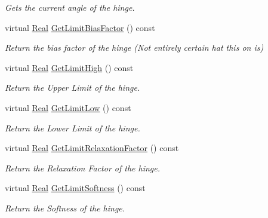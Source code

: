 \begin{DoxyCompactItemize}
\begin{DoxyCompactList}\small\item\em Gets the current angle of the hinge. \item\end{DoxyCompactList}\item 
virtual \hyperlink{namespaceMezzanine_a726731b1a7df72bf3583e4a97282c6f6}{Real} \hyperlink{classMezzanine_1_1HingeConstraint_aa614cc523ffa01d50e83ef2472126419}{GetLimitBiasFactor} () const 
\begin{DoxyCompactList}\small\item\em Return the bias factor of the hinge (Not entirely certain hat this on is) \item\end{DoxyCompactList}\item 
virtual \hyperlink{namespaceMezzanine_a726731b1a7df72bf3583e4a97282c6f6}{Real} \hyperlink{classMezzanine_1_1HingeConstraint_acb0a9676b91cf7c987569bed3510b5da}{GetLimitHigh} () const 
\begin{DoxyCompactList}\small\item\em Return the Upper Limit of the hinge. \item\end{DoxyCompactList}\item 
virtual \hyperlink{namespaceMezzanine_a726731b1a7df72bf3583e4a97282c6f6}{Real} \hyperlink{classMezzanine_1_1HingeConstraint_a7815264c012e03fdf09a72d1aa76e50f}{GetLimitLow} () const 
\begin{DoxyCompactList}\small\item\em Return the Lower Limit of the hinge. \item\end{DoxyCompactList}\item 
virtual \hyperlink{namespaceMezzanine_a726731b1a7df72bf3583e4a97282c6f6}{Real} \hyperlink{classMezzanine_1_1HingeConstraint_a547dfa04268f9fa0d938fb00a082fc03}{GetLimitRelaxationFactor} () const 
\begin{DoxyCompactList}\small\item\em Return the Relaxation Factor of the hinge. \item\end{DoxyCompactList}\item 
virtual \hyperlink{namespaceMezzanine_a726731b1a7df72bf3583e4a97282c6f6}{Real} \hyperlink{classMezzanine_1_1HingeConstraint_aa5202368b6de6721f0f6f96b6210e83f}{GetLimitSoftness} () const 
\begin{DoxyCompactList}\small\item\em Return the Softness of the hinge. \item\end{DoxyCompactList}\item 

\end{DoxyCompactItemize}
